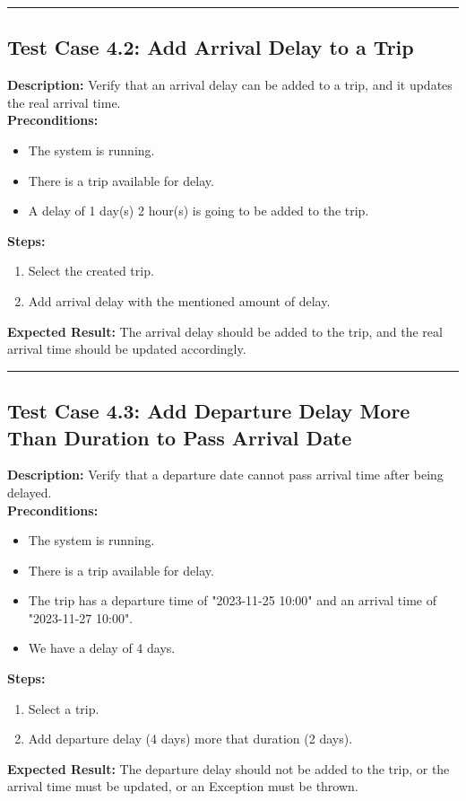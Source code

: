 \documentclass{article}
\begin{document}
\bigskip
\hrule
\bigskip

\subsection{Test Case 4.2: Add Arrival Delay to a Trip}

\textbf{Description:} Verify that an arrival delay can be added to a trip, and it updates the real arrival time.\\
\textbf{Preconditions:}
\begin{itemize}
  \item The system is running.
  \item There is a trip available for delay.
  \item A delay of 1 day(s) 2 hour(s) is going to be added to the trip.
\end{itemize}
\textbf{Steps:}
\begin{enumerate}
    \item Select the created trip.
    \item Add arrival delay with the mentioned amount of delay.
\end{enumerate}
\textbf{Expected Result:} The arrival delay should be added to the trip, and the real arrival time should be updated accordingly.

\bigskip
\hrule
\bigskip

\subsection{Test Case 4.3: Add Departure Delay More Than Duration to Pass Arrival Date}

\textbf{Description:} Verify that a departure date cannot pass arrival time after being delayed.\\
\textbf{Preconditions:}
\begin{itemize}
  \item The system is running.
  \item There is a trip available for delay.
  \item The trip has a departure time of "2023-11-25 10:00" and an arrival time of "2023-11-27 10:00".
  \item We have a delay of 4 days.
\end{itemize}
\textbf{Steps:}
\begin{enumerate}
    \item Select a trip.
    \item Add departure delay (4 days) more that duration (2 days).
\end{enumerate}
\textbf{Expected Result:} The departure delay should not be added to the trip, or the arrival time must be updated, or an Exception must be thrown.
\end{document}

